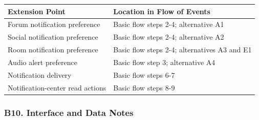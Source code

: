 \documentclass[12pt]{article}
\renewcommand{\baselinestretch}{1.5}
\begin{document}
\begingroup
\small
\renewcommand{\baselinestretch}{1.0}\selectfont
\renewcommand{\arraystretch}{1.15}
\setlength{\tabcolsep}{6pt}
\begin{longtable}{|>{\raggedright\arraybackslash}p{}|>{\raggedright\arraybackslash}p{}|}
\hline
\textbf{Extension Point} & \textbf{Location in Flow of Events} \\ \hline
\endhead
Forum notification preference & Basic flow steps 2-4; alternative A1 \\ \hline
Social notification preference & Basic flow steps 2-4; alternative A2 \\ \hline
Room notification preference & Basic flow steps 2-4; alternatives A3 and E1 \\ \hline
Audio alert preference & Basic flow step 3; alternative A4 \\ \hline
Notification delivery & Basic flow steps 6-7 \\ \hline
Notification-center read actions & Basic flow steps 8-9 \\ \hline
\end{longtable}
\endgroup
\par\medskip

\hypertarget{sec:b10-interface-and-data-notes}{}
\subsubsection*{B10. Interface and Data Notes}
\par\medskip
\end{document}
